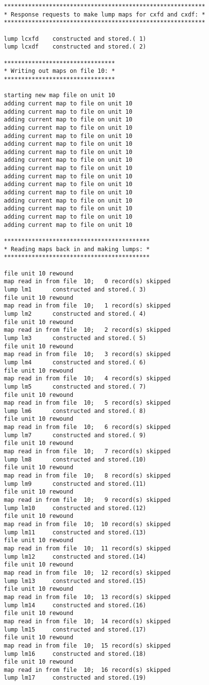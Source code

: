 \begin{footnotesize}
\begin{verbatim}
**********************************************************
* Response requests to make lump maps for cxfd and cxdf: *
**********************************************************

lump lcxfd    constructed and stored.( 1)
lump lcxdf    constructed and stored.( 2)

********************************
* Writing out maps on file 10: *
********************************

starting new map file on unit 10
adding current map to file on unit 10
adding current map to file on unit 10
adding current map to file on unit 10
adding current map to file on unit 10
adding current map to file on unit 10
adding current map to file on unit 10
adding current map to file on unit 10
adding current map to file on unit 10
adding current map to file on unit 10
adding current map to file on unit 10
adding current map to file on unit 10
adding current map to file on unit 10
adding current map to file on unit 10
adding current map to file on unit 10
adding current map to file on unit 10
adding current map to file on unit 10

******************************************
* Reading maps back in and making lumps: *
******************************************

file unit 10 rewound
map read in from file  10;   0 record(s) skipped
lump lm1      constructed and stored.( 3)
file unit 10 rewound
map read in from file  10;   1 record(s) skipped
lump lm2      constructed and stored.( 4)
file unit 10 rewound
map read in from file  10;   2 record(s) skipped
lump lm3      constructed and stored.( 5)
file unit 10 rewound
map read in from file  10;   3 record(s) skipped
lump lm4      constructed and stored.( 6)
file unit 10 rewound
map read in from file  10;   4 record(s) skipped
lump lm5      constructed and stored.( 7)
file unit 10 rewound
map read in from file  10;   5 record(s) skipped
lump lm6      constructed and stored.( 8)
file unit 10 rewound
map read in from file  10;   6 record(s) skipped
lump lm7      constructed and stored.( 9)
file unit 10 rewound
map read in from file  10;   7 record(s) skipped
lump lm8      constructed and stored.(10)
file unit 10 rewound
map read in from file  10;   8 record(s) skipped
lump lm9      constructed and stored.(11)
file unit 10 rewound
map read in from file  10;   9 record(s) skipped
lump lm10     constructed and stored.(12)
file unit 10 rewound
map read in from file  10;  10 record(s) skipped
lump lm11     constructed and stored.(13)
file unit 10 rewound
map read in from file  10;  11 record(s) skipped
lump lm12     constructed and stored.(14)
file unit 10 rewound
map read in from file  10;  12 record(s) skipped
lump lm13     constructed and stored.(15)
file unit 10 rewound
map read in from file  10;  13 record(s) skipped
lump lm14     constructed and stored.(16)
file unit 10 rewound
map read in from file  10;  14 record(s) skipped
lump lm15     constructed and stored.(17)
file unit 10 rewound
map read in from file  10;  15 record(s) skipped
lump lm16     constructed and stored.(18)
file unit 10 rewound
map read in from file  10;  16 record(s) skipped
lump lm17     constructed and stored.(19)


\end{verbatim}
\end{footnotesize}
